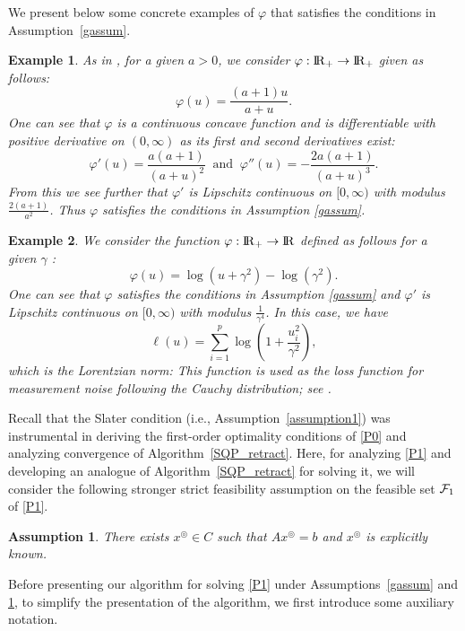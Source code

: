 \documentclass[10pt]{article}
\numberwithin{equation}{section}
\newtheorem{example}{Example}[section]
\newtheorem{assumption}{Assumption}[section]
\def\R{{\rm I\!R}}
\def\xfeasss{x^\circledcirc}
\begin{document}
We present below some concrete examples of $\varphi$ that satisfies the conditions in Assumption~\ref{gassum}.
\begin{example}
As in \cite{AhPX17}, for a given $a > 0$, we consider $\varphi:\R_+\rightarrow \R_+$ given as follows:
\[
\varphi(u) = \frac{(a + 1)u}{a + u}.
\]
One can see that $\varphi$ is a continuous concave function and is differentiable with positive derivative on $(0, \infty)$ as its first and second derivatives exist:
\[
\varphi'(u) = \frac{a(a+1)}{(a+u)^2}\ \text{ and }\  \varphi''(u) = -\frac{2a(a+1)}{(a+u)^3}.
\]
From this we see further that $\varphi'$ is Lipschitz continuous on $[0,\infty)$ with modulus $\frac{2(a+1)}{a^2}$. Thus $\varphi$ satisfies the conditions in Assumption \ref{gassum}.
\end{example}

\begin{example}\label{Loren}
We consider the function $\varphi:\R_+\to \R$ defined as follows for a given $\gamma$ \cite{CaWB08}:
\begin{equation*}
\varphi(u) = \log(u + \gamma^2) - \log(\gamma^2).
\end{equation*}
One can see that $\varphi$ satisfies the conditions in Assumption \ref{gassum} and $\varphi'$ is Lipschitz continuous on $[0,\infty)$ with modulus $\frac{1}{\gamma^4}$. In this case, we have
\[
\ell(u) = \sum_{i=1}^p \log\left(1 + \frac{u_i^2}{\gamma^2}\right),
\]
which is the Lorentzian norm: This function is used as the loss function for measurement noise following the Cauchy distribution; see \cite{CaBA10,CaRA16}.
\end{example}
Recall that the Slater condition (i.e., Assumption~\ref{assumption1}) was instrumental in deriving the first-order optimality conditions of \eqref{P0} and analyzing convergence of Algorithm~\ref{SQP_retract}.
Here, for analyzing \eqref{P1} and developing an analogue of Algorithm~\ref{SQP_retract} for solving it, we will consider the following stronger strict feasibility assumption on the feasible set ${\cal F}_1$ of \eqref{P1}.
\begin{assumption}\label{assumption4}
{\color{blue} There exists $\xfeasss\in C$ such that $A\xfeasss = b$ and $\xfeasss$ is explicitly known.}
\end{assumption}

Before presenting our algorithm for solving \eqref{P1} under Assumptions~\ref{gassum} and \ref{assumption4}, to simplify the presentation of the algorithm, we first introduce some auxiliary notation.
\end{document}
